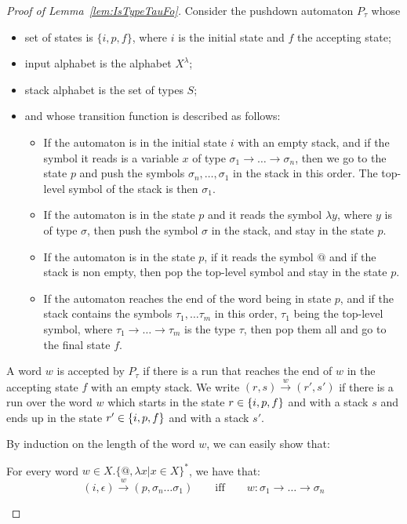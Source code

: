 \begin{proof}[Proof of Lemma~\ref{lem:IsTypeTauFo}]
Consider the pushdown automaton $P_\tau$ whose
\begin{itemize}
\item  set of states is $\{i, p, f\}$, where $i$ is the initial state and $f$ the accepting state;
\item input alphabet is the alphabet $X^\lambda$;
\item stack alphabet is the set of types $S$;
\item and whose transition function is described as follows:
\begin{itemize}
\item If the automaton is in the initial state $i$ with an empty stack, and if the symbol it reads is a variable $x$ of type $\sigma_1\rightarrow\dots\rightarrow\sigma_n$, then we go to the state $p$ and push the symbols $\sigma_n,\dots,\sigma_1$  in the stack in this order. The top-level symbol of the stack is then $\sigma_1$.
\item If the automaton is in the state $p$ and it reads the symbol $\lambda y$, where $y$ is of type $\sigma$, then push the symbol $\sigma$ in the stack, and stay in the state $p$.
\item  If the automaton is in the state $p$,  if it reads the symbol $@$ and if the stack is non empty, then pop the top-level symbol and stay in the state $p$.
\item If the automaton reaches the end of the word being in state $p$, and if the stack contains the symbols $\tau_1,\dots\tau_m$ in this order, $\tau_1$ being the top-level symbol, where $\tau_1\rightarrow\dots\rightarrow\tau_m$ is the type $\tau$, then pop them all and go to the final state $f$.  
\end{itemize}
\end{itemize}
A word $w$ is accepted by $P_\tau$ if there is a run that reaches the end of $w$ in the accepting state $f$ with an empty stack. We write $(r, s)\xrightarrow{w} (r', s')$ if there is a run over the word $w$ which starts in the state $r\in\{i, p,f\}$ and with a stack $s$ and ends up in the state $r'\in\{i, p,f\}$ and with a stack $s'$.


By induction on the length of the word $w$, we can easily show that:
\begin{lemma}
For every word $w\in X.\{@,\lambda x | x\in X \}^*$, we have that:
 $$(i, \epsilon)\xrightarrow{w} (p, \sigma_n\dots\sigma_1) \qquad\text{iff} \qquad 
w:\sigma_1\rightarrow\dots\rightarrow\sigma_n$$ 
\end{lemma}


\end{proof}
